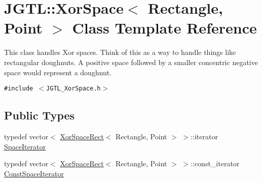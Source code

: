 \hypertarget{class_j_g_t_l_1_1_xor_space}{
\section{JGTL::Xor\-Space$<$ Rectangle, Point $>$ Class Template Reference}
\label{class_j_g_t_l_1_1_xor_space}
}
This class handles Xor spaces. Think of this as a way to handle things like rectangular doughnuts. A positive space followed by a smaller concentric negative space would represent a doughnut.  


{\tt \#include $<$JGTL\_\-Xor\-Space.h$>$}

\subsection*{Public Types}
\begin{CompactItemize}
\item 
typedef vector$<$ \hyperlink{class_j_g_t_l_1_1_xor_space_rect}{Xor\-Space\-Rect}$<$ Rectangle, Point $>$ $>$::iterator \hyperlink{class_j_g_t_l_1_1_xor_space_17c93bf8f2f8ec86efcc3e4a63e4a6ef}{Space\-Iterator}
\item 
typedef vector$<$ \hyperlink{class_j_g_t_l_1_1_xor_space_rect}{Xor\-Space\-Rect}$<$ Rectangle, Point $>$ $>$::const\_\-iterator \hyperlink{class_j_g_t_l_1_1_xor_space_467518dcd95f1c3f009f59ad3ea5d8df}{Const\-Space\-Iterator}
\end{CompactItemize}
